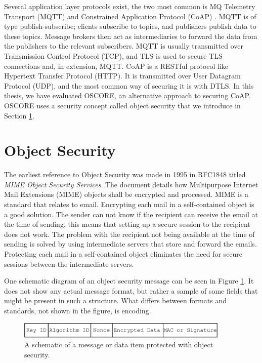 Several application layer protocols exist, the two most common is MQ Telemetry Transport (MQTT) \cite{hunkeler2008mqtt} and Constrained Application Protocol (CoAP) \cite{rfc7252}. MQTT is of type publish-subscribe; clients subscribe to topics, and publishers publish data to these topics. Message brokers then act as intermediaries to forward the data from the publishers to the relevant subscribers.
MQTT is usually transmitted over Transmission Control Protocol (TCP), and TLS is used to secure TLS connections and, in extension, MQTT.
CoAP is a RESTful protocol like Hypertext Transfer Protocol (HTTP). It is transmitted over User Datagram Protocol (UDP), and the most common way of securing it is with DTLS. In this thesis, we have evaluated OSCORE, an alternative approach to securing CoAP. OSCORE uses a security concept called object security that we introduce in Section \ref{sec:object_security}.

\section{Object Security}
\label{sec:object_security}
The earliest reference to Object Security was made in 1995 in RFC1848 \cite{RFC1848} titled \textit{MIME Object Security Services}. The document details how Multipurpose Internet Mail Extensions (MIME) objects shall be encrypted and processed. MIME is a standard that relates to email. Encrypting each mail in a self-contained object is a good solution. The sender can not know if the recipient can receive the email at the time of sending, this means that setting up a secure session to the recipient does not work. The problem with the recipient not being available at the time of sending is solved by using intermediate servers that store and forward the emails. Protecting each mail in a self-contained object eliminates the need for secure sessions between the intermediate servers.

One schematic diagram of an object security message can be seen in Figure \ref{fig:object-security}. It does not show any actual message format, but rather a sample of some fields that might be present in such a structure. What differs between formats and standards, not shown in the figure, is encoding. 

\begin{figure}[ht]
\centering
\includegraphics[width=0.9\textwidth]{images/object_security.pdf}
\caption{A schematic of a message or data item protected with object security.}
\label{fig:object-security}
\end{figure}



